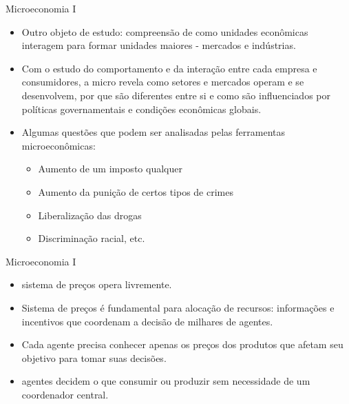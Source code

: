 \documentclass[10pt]{beamer}
\begin{document}
\begin{frame}{Microeconomia I}
    \begin{itemize}
        \item Outro objeto de estudo: compreensão de como unidades econômicas interagem para formar unidades maiores - mercados e indústrias. \bigskip
        \item Com o estudo do comportamento e da interação entre cada empresa e consumidores, a micro revela como setores e mercados operam e se desenvolvem, por que são diferentes entre si e como são influenciados por políticas governamentais e condições econômicas globais.\bigskip

        \item Algumas questões que podem ser analisadas pelas ferramentas microeconômicas: \bigskip
        \begin{itemize}
            \item Aumento de um imposto qualquer \medskip
             \item Aumento da punição de certos tipos de crimes \medskip 
             \item Liberalização das drogas \medskip
             \item Discriminação racial, etc.
        \end{itemize}
    \end{itemize}
\end{frame}

\begin{frame}{Microeconomia I}
    \begin{itemize}
        \item {} sistema de preços opera livremente. \bigskip
        \item Sistema de preços é fundamental para alocação de recursos: informações e incentivos que coordenam a decisão de milhares de agentes. \bigskip
        \item Cada agente precisa conhecer apenas os preços dos produtos que afetam seu objetivo para tomar suas decisões. \bigskip
        \item {} agentes decidem o que consumir ou produzir sem necessidade de um coordenador central.
    \end{itemize}
\end{frame}
\end{document}
